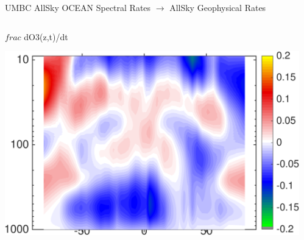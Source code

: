 \documentclass[10pt,t]{beamer}
\begin{document}
\begin{frame}{UMBC AllSky OCEAN Spectral Rates $\rightarrow$ AllSky Geophysical Rates}
\vspace{-0.25in}

\begin{columns}
\begin{column}{0.45\columnwidth}
\begin{block}{\footnotesize $frac$ dO3(z,t)/dt}
\vspace{-0.1in}
\begin{center}
\includegraphics[width=\linewidth]{Figs/CloudAnom/Desc/o3_lat_p_rates_from_obs_specral_rates.png}
\end{center}
\end{block}
\end{column}

\begin{column}{0.45\columnwidth}

\end{column}
\end{columns}
\end{frame}

\end{document}
